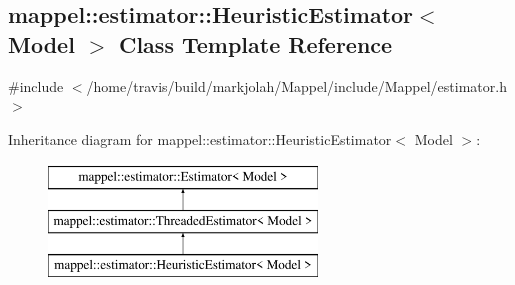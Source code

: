 \hypertarget{classmappel_1_1estimator_1_1HeuristicEstimator}{}\subsection{mappel\+:\+:estimator\+:\+:Heuristic\+Estimator$<$ Model $>$ Class Template Reference}
\label{classmappel_1_1estimator_1_1HeuristicEstimator}


{\ttfamily \#include $<$/home/travis/build/markjolah/\+Mappel/include/\+Mappel/estimator.\+h$>$}

Inheritance diagram for mappel\+:\+:estimator\+:\+:Heuristic\+Estimator$<$ Model $>$\+:\begin{figure}[H]
\begin{center}
\leavevmode
\includegraphics[height=3.000000cm]{classmappel_1_1estimator_1_1HeuristicEstimator}
\end{center}
\end{figure}
